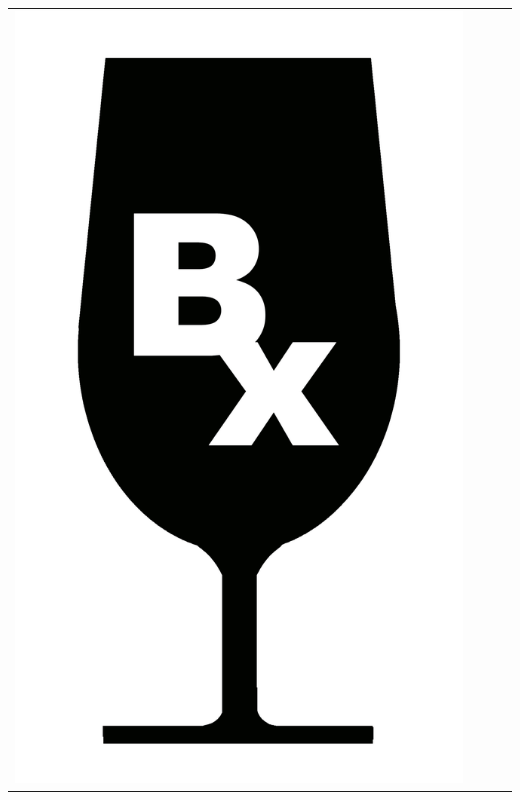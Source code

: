 {\begin{center}
\begin{tabular}{ c c c c}
\includegraphics[scale=0.021, trim= 0em -5em -5em -5em,]{Icones/icon_bordeaux_black.pdf}
&

\end{tabular}
\end{center}}
